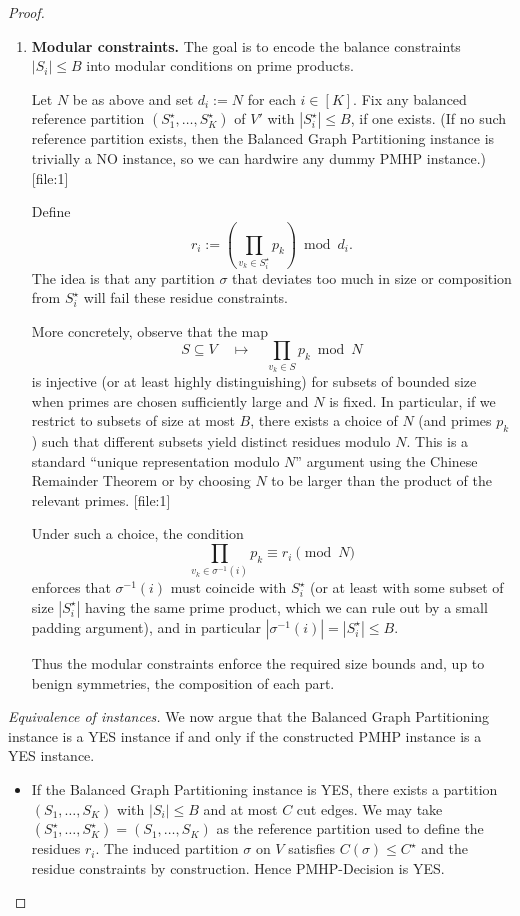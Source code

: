 \documentclass[11pt]{article}
\begin{document}
\begin{proof}
\begin{enumerate}[label=(\alph*)]
  \item \textbf{Modular constraints.} The goal is to encode the balance constraints $|S_i|\le B$ into modular conditions on prime products.

  Let $N$ be as above and set $d_i := N$ for each $i\in[K]$. Fix any balanced reference partition $(S_1^\star,\dots,S_K^\star)$ of $V'$ with $|S_i^\star|\le B$, if one exists. (If no such reference partition exists, then the Balanced Graph Partitioning instance is trivially a NO instance, so we can hardwire any dummy PMHP instance.) [file:1]

  Define
  \[
    r_i := \left(\prod_{v_k\in S_i^\star} p_k\right) \bmod d_i.
  \]
  The idea is that any partition $\sigma$ that deviates too much in size or composition from $S_i^\star$ will fail these residue constraints.

  More concretely, observe that the map
  \[
    S \subseteq V \quad\mapsto\quad \prod_{v_k\in S} p_k \bmod N
  \]
  is injective (or at least highly distinguishing) for subsets of bounded size when primes are chosen sufficiently large and $N$ is fixed. In particular, if we restrict to subsets of size at most $B$, there exists a choice of $N$ (and primes $p_k$) such that different subsets yield distinct residues modulo $N$. This is a standard ``unique representation modulo $N$'' argument using the Chinese Remainder Theorem or by choosing $N$ to be larger than the product of the relevant primes. [file:1]

  Under such a choice, the condition
  \[
    \prod_{v_k\in\sigma^{-1}(i)} p_k \equiv r_i \pmod{N}
  \]
  enforces that $\sigma^{-1}(i)$ must coincide with $S_i^\star$ (or at least with some subset of size $|S_i^\star|$ having the same prime product, which we can rule out by a small padding argument), and in particular $|\sigma^{-1}(i)| = |S_i^\star|\le B$.

  Thus the modular constraints enforce the required size bounds and, up to benign symmetries, the composition of each part.
\end{enumerate}

\emph{Equivalence of instances.} We now argue that the Balanced Graph Partitioning instance is a YES instance if and only if the constructed PMHP instance is a YES instance.

\begin{itemize}
  \item If the Balanced Graph Partitioning instance is YES, there exists a partition $(S_1,\dots,S_K)$ with $|S_i|\le B$ and at most $C$ cut edges. We may take $(S_1^\star,\dots,S_K^\star) = (S_1,\dots,S_K)$ as the reference partition used to define the residues $r_i$. The induced partition $\sigma$ on $V$ satisfies $C(\sigma)\le C^\star$ and the residue constraints by construction. Hence PMHP-Decision is YES.


\end{itemize}
\end{proof}
\end{document}

